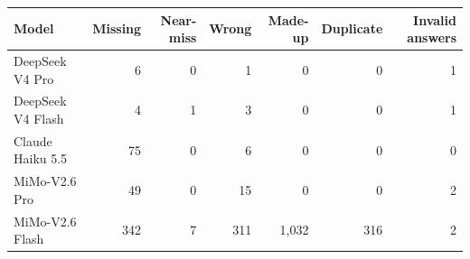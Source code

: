 \begin{tabular}{lrrrrrr}
\toprule
Model & Missing & Near-miss & Wrong & Made-up & Duplicate & Invalid answers \\
\midrule
DeepSeek V4 Pro & 6 & 0 & 1 & 0 & 0 & 1 \\
DeepSeek V4 Flash & 4 & 1 & 3 & 0 & 0 & 1 \\
Claude Haiku 5.5 & 75 & 0 & 6 & 0 & 0 & 0 \\
MiMo-V2.6 Pro & 49 & 0 & 15 & 0 & 0 & 2 \\
MiMo-V2.6 Flash & 342 & 7 & 311 & 1,032 & 316 & 2 \\
\bottomrule
\end{tabular}
